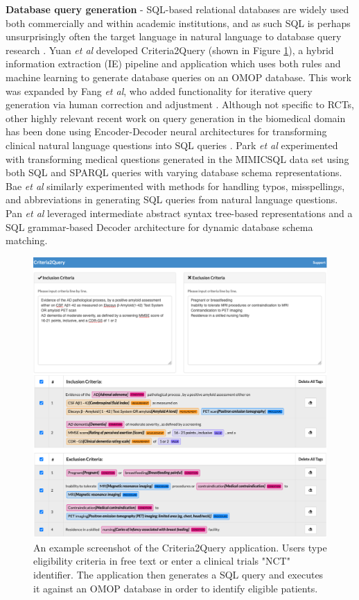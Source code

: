 \documentclass[../main.tex]{subfiles}
\begin{document}
\textbf{Database query generation} - SQL-based relational databases are widely used both commercially and within academic institutions, and as such SQL is perhaps unsurprisingly often the target language in natural language to database query research \cite{dar2019frameworks}. Yuan \textit{et al} developed Criteria2Query (shown in Figure \ref{fig_criteria2query}), a hybrid information extraction (IE) pipeline and application which uses both rules and machine learning to generate database queries on an OMOP database. This work was expanded by Fang \textit{et al}, who added functionality for iterative query generation via human correction and adjustment \cite{fang2022combining}. Although not specific to RCTs, other highly relevant recent work on query generation in the biomedical domain has been done using Encoder-Decoder neural architectures for transforming clinical natural language questions into SQL queries \cite{bae2021question, park2021knowledge, wang2020text, pan2021bert, dhayne2021emr2vec}. Park \textit{et al} \cite{park2021knowledge} experimented with transforming medical questions generated in the MIMICSQL data set \cite{johnson2016mimic, wang2020text} using both SQL and SPARQL queries with varying database schema representations. Bae \textit{et al} similarly experimented with methods for handling typos, misspellings, and abbreviations in generating SQL queries from natural language questions. Pan \textit{et al} \cite{pan2021bert} leveraged intermediate abstract syntax tree-based representations and a SQL grammar-based Decoder architecture for dynamic database schema matching. 

\begin{figure}[h!]
  \includegraphics[scale=0.77]{Figures/2_background/criteria2query.png}  
\caption{An example screenshot of the Criteria2Query application. Users type eligibility criteria in free text or enter a clinical trials "NCT" identifier. The application then generates a SQL query and executes it against an OMOP database in order to identify eligible patients.}
\label{fig_criteria2query}
\end{figure}
\end{document}
